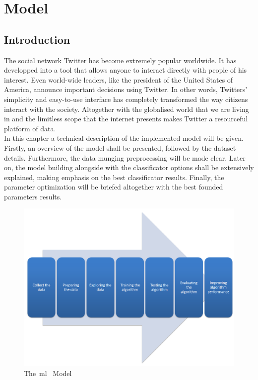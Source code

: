 \chapter{Model}
\label{chap:model}

\section{Introduction}
\label{sec:intromodel}
The social network Twitter has become extremely popular worldwide. It has developped into a tool that allows anyone to interact directly with people of his interest. Even world-wide leaders, like the president of the United States of America, announce important decisions using Twitter. In other words, Twitters' simplicity and easy-to-use interface has completely transformed the way citizens interact with the society. Altogether with the globalised world that we are living in and the limitless scope that the internet presents makes Twitter a resourceful platform of data.\\
In this chapter a technical description of the implemented model will be given.\\
Firstly, an overview of the model shall be presented, followed by the dataset details. Furthermore, the data munging preprocessing will be made clear. Later on, the model building alongside with the classificator options shall be extensively explained, making emphasis on the best classificator results. Finally, the parameter optimization will be briefed altogether with the best founded parameters results.
\begin{figure}
	\centering
	\includegraphics[]{img/model.png}
	\caption{The~\acl{ml}~\cite{model} Model}
	\label{fig:model}
\end{figure}
\par
